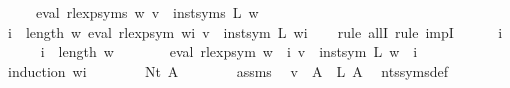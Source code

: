 \begin{isabellebody}
\ \ \ \ \ {\isachardoublequoteopen}eval\ {\isacharparenleft}{\kern0pt}rlexp{\isacharunderscore}{\kern0pt}syms\ w{\isacharparenright}{\kern0pt}\ v\ {\isacharequal}{\kern0pt}\ inst{\isacharunderscore}{\kern0pt}syms\ L\ w{\isachardoublequoteclose}\isanewline
%
\isadelimproof
%
\endisadelimproof
%
\isatagproof
{}\isamarkupfalse%
\ {\isacharminus}{\kern0pt}\isanewline
\ \ \isamarkupfalse%
\ {\isachardoublequoteopen}{\isasymforall}i\ {\isacharless}{\kern0pt}\ length\ w{\isachardot}{\kern0pt}\ eval\ {\isacharparenleft}{\kern0pt}rlexp{\isacharunderscore}{\kern0pt}sym\ {\isacharparenleft}{\kern0pt}w{\isacharbang}{\kern0pt}i{\isacharparenright}{\kern0pt}{\isacharparenright}{\kern0pt}\ v\ {\isacharequal}{\kern0pt}\ inst{\isacharunderscore}{\kern0pt}sym\ L\ {\isacharparenleft}{\kern0pt}w{\isacharbang}{\kern0pt}i{\isacharparenright}{\kern0pt}{\isachardoublequoteclose}\isanewline
\ \ \isamarkupfalse%
\ {\isacharparenleft}{\kern0pt}rule\ allI{\isacharcomma}{\kern0pt}\ rule\ impI{\isacharparenright}{\kern0pt}\isanewline
\ \ \ \ \isamarkupfalse%
\ i\isanewline
\ \ \ \ \isamarkupfalse%
\ {\isachardoublequoteopen}i\ {\isacharless}{\kern0pt}\ length\ w{\isachardoublequoteclose}\isanewline
\ \ \ \ \isamarkupfalse%
\ \isamarkupfalse%
\ {\isachardoublequoteopen}eval\ {\isacharparenleft}{\kern0pt}rlexp{\isacharunderscore}{\kern0pt}sym\ {\isacharparenleft}{\kern0pt}w\ {\isacharbang}{\kern0pt}\ i{\isacharparenright}{\kern0pt}{\isacharparenright}{\kern0pt}\ v\ {\isacharequal}{\kern0pt}\ inst{\isacharunderscore}{\kern0pt}sym\ L\ {\isacharparenleft}{\kern0pt}w\ {\isacharbang}{\kern0pt}\ i{\isacharparenright}{\kern0pt}{\isachardoublequoteclose}\isanewline
\ \ \ \ \ \ \isamarkupfalse%
\ {\isacharparenleft}{\kern0pt}induction\ {\isachardoublequoteopen}w{\isacharbang}{\kern0pt}i{\isachardoublequoteclose}{\isacharparenright}{\kern0pt}\isanewline
\ \ \ \ \ \ \isamarkupfalse%
\ {\isacharparenleft}{\kern0pt}Nt\ A{\isacharparenright}{\kern0pt}\isanewline
\ \ \ \ \ \ \isamarkupfalse%
\ assms\ \isamarkupfalse%
\ {\isachardoublequoteopen}v\ {\isacharparenleft}{\kern0pt}{\isasymgamma}{\isacharprime}{\kern0pt}\ A{\isacharparenright}{\kern0pt}\ {\isacharequal}{\kern0pt}\ L\ A{\isachardoublequoteclose}\ \isamarkupfalse%
\ nts{\isacharunderscore}{\kern0pt}syms{\isacharunderscore}{\kern0pt}def\ \isamarkupfalse%

\end{isabellebody}
